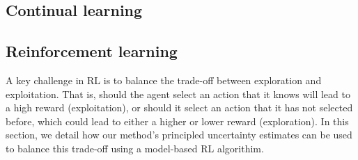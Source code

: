 \documentclass{article}
\begin{document}
\subsection{Continual learning}

\subsection{Reinforcement learning}
A key challenge in RL is to balance the trade-off between exploration and exploitation.
That is, should the agent select an action that it knows will lead to a high reward (exploitation), or should it select an action that it has
not selected before, which could lead to either a higher or lower reward (exploration).
In this section, we detail how our method's principled uncertainty estimates can be used to balance this trade-off using a model-based RL algorithim.
\end{document}
